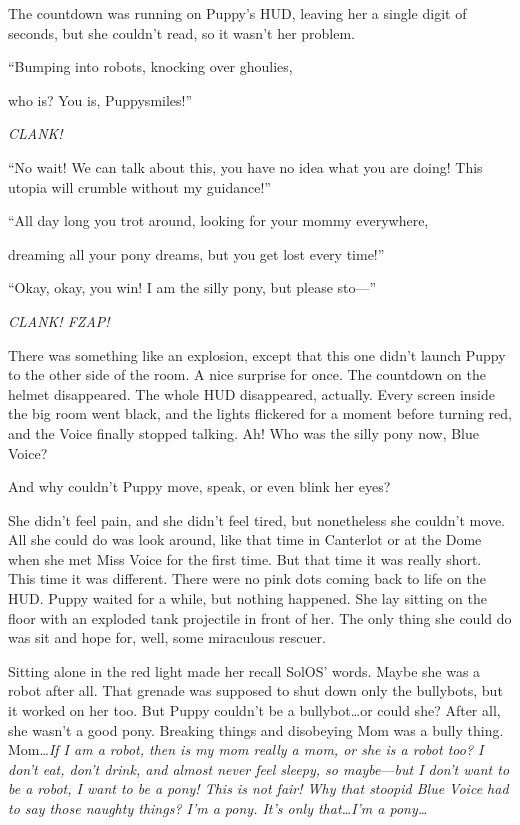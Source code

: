 The countdown was running on Puppy's HUD, leaving her a single digit of seconds, but she couldn't read, so it wasn't her problem.

\begin{song}
	``Bumping into robots, knocking over ghoulies,

	who is? You is, Puppysmiles!''
\end{song}

\emph{CLANK!}

``No wait! We can talk about this, you have no idea what you are doing! This utopia will crumble without my guidance!''

\begin{song}
	``All day long you trot around, looking for your mommy everywhere,

	dreaming all your pony dreams, but you get lost every time!''
\end{song}

``Okay, okay, you win! I am the silly pony, but please sto---''

\emph{CLANK! FZAP!}

There was something like an explosion, except that this one didn't launch Puppy to the other side of the room. A nice surprise for once. The countdown on the helmet disappeared. The whole HUD disappeared, actually. Every screen inside the big room went black, and the lights flickered for a moment before turning red, and the Voice finally stopped talking. Ah! Who was the silly pony now, Blue Voice?

And why couldn't Puppy move, speak, or even blink her eyes?

She didn't feel pain, and she didn't feel tired, but nonetheless she couldn't move. All she could do was look around, like that time in Canterlot or at the Dome when she met Miss Voice for the first time. But that time it was really short. This time it was different. There were no pink dots coming back to life on the HUD. Puppy waited for a while, but nothing happened. She lay sitting on the floor with an exploded tank projectile in front of her. The only thing she could do was sit and hope for, well, some miraculous rescuer.

Sitting alone in the red light made her recall SolOS' words. Maybe she was a robot after all. That grenade was supposed to shut down only the bullybots, but it worked on her too. But Puppy couldn't be a bullybot\dots or could she? After all, she wasn't a good pony. Breaking things and disobeying Mom was a bully thing. Mom\dots \emph{If I am a robot, then is my mom really a mom, or she is a robot too? I don't eat, don't drink, and almost never feel sleepy, so maybe}\/---\emph{but I don't want to be a robot, I want to be a pony! This is not fair! Why that stoopid Blue Voice had to say those naughty things? I'm a pony. It's only that\dots I'm a pony\dots}


